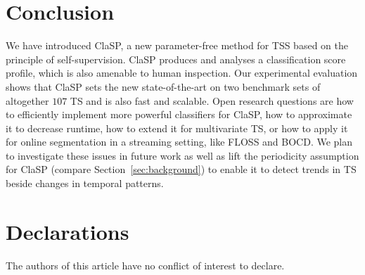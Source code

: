 \documentclass[pdflatex,sn-basic]{sn-jnl}
\begin{document}
\section{Conclusion}\label{sec:conclusion}

We have introduced ClaSP, a new parameter-free method for TSS based on the principle of self-supervision. ClaSP produces and analyses a classification score profile, which is also amenable to human inspection. Our experimental evaluation shows that ClaSP sets the new state-of-the-art on two benchmark sets of altogether $107$ TS and is also fast and scalable. Open research questions are how to efficiently implement more powerful classifiers for ClaSP, how to approximate it to decrease runtime, how to extend it for multivariate TS, or how to apply it for online segmentation in a streaming setting, like FLOSS and BOCD. We plan to investigate these issues in future work as well as lift the periodicity assumption for ClaSP (compare Section~\ref{sec:background}) to enable it to detect trends in TS beside changes in temporal patterns.

\section{Declarations}\label{sec:conclusion}

The authors of this article have no conflict of interest to declare. 


\end{document}
